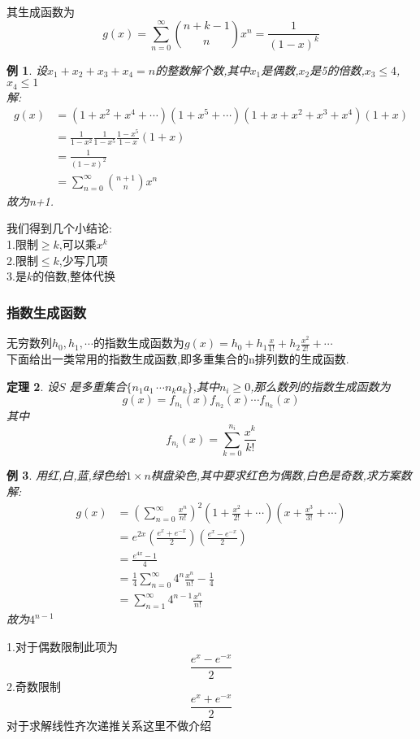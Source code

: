\documentclass[12pt, a4paper, oneside]{ctexbook}
\newtheorem{theorem}{定理}[section]
\newtheorem{example}[theorem]{例}
\begin{document}
其生成函数为
$$
g(x)=\sum_{n=0}^{\infty} \binom{n+k-1}{n}x^n=\frac{1}{(1-x)^k}
$$

\begin{example}
  设$x_1+x_2+x_3+x_4=n$的整数解个数,其中$x_1$是偶数,$x_2$是5的倍数,$x_3\le 4$,$x_4\le 1$ \\
  解:\\
  $$
  \begin{aligned}
    g(x)&=(1+x^2+x^4+\cdots)(1+x^5+\cdots)(1+x+x^2+x^3+x^4)(1+x)\\
    &=\frac{1}{1-x^2} \frac{1}{1-x^5} \frac{1-x^5}{1-x} (1+x)\\
    &=\frac{1}{(1-x)^2}\\
    &=\sum_{n=0}^{\infty} \binom{n+1}{n} x^n
  \end{aligned}
  $$
  故为n+1.
\end{example}
我们得到几个小结论:\\
1.限制$\ge k$,可以乘$x^k$\\
2.限制$\le k$,少写几项\\
3.是$k$的倍数,整体代换\\

\subsubsection{指数生成函数}
无穷数列$h_0,h_1,\cdots $的指数生成函数为$g(x)=h_0+h_1 \frac{x}{1!}+h_2 \frac{x^2}{2!}+\cdots $\\
下面给出一类常用的指数生成函数,即多重集合的n排列数的生成函数.\\
\begin{theorem}
  设$S$ 是多重集合$\{n_1 a_1\,\cdots n_k a_k\}$,其中$n_i\ge 0$,那么数列的指数生成函数为\\
  $$
  g(x)=f_{n_1}(x)f_{n_2}(x) \cdots f_{n_k} (x)
  $$
  其中
  $$
  f_{n_i}(x)=\sum_{k=0}^{n_i} \frac{x^k}{k!}
  $$
\end{theorem} 

\begin{example}
  用红,白,蓝,绿色给$1\times n$棋盘染色,其中要求红色为偶数,白色是奇数,求方案数\\
  解:\\
  $$
  \begin{aligned}
    g(x)&=\left(\sum_{n=0}^{\infty}\frac{x^n}{n!} \right)^2\left(1+\frac{x^2}{2!}+\cdots \right)\left(x+\frac{x^3}{3!}+\cdots \right)\\
    &=e^{2x}\left(\frac{e^x+e^{-x}}{2} \right) \left( \frac{e^x-e^{-x}}{2} \right)\\
    &=\frac{e^{4x}-1}{4}\\
    &=\frac{1}{4}\sum_{n=0}^{\infty} 4^{n} \frac{x^n}{n!}-\frac{1}{4}\\
    &=\sum_{n=1}^{\infty} 4^{n-1} \frac{x^n}{n!}
    \end{aligned}
  $$
  故为$4^{n-1}$
\end{example}
1.对于偶数限制此项为\\
\[
\frac{e^x-e^{-x}}{2}
\]
2.奇数限制\\
\[
\frac{e^x+e^{-x}}{2}
\]
对于求解线性齐次递推关系这里不做介绍
\end{document}
